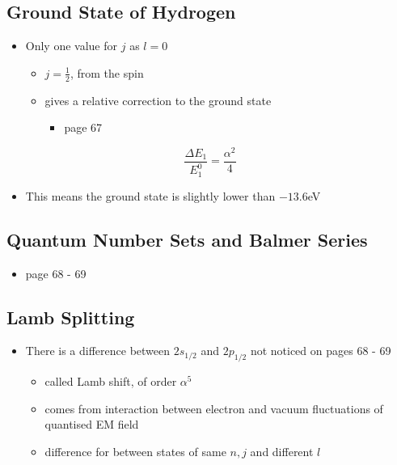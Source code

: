 \documentclass[a4paper,11pt,normalem]{article}
\begin{document}
\subsection{Ground State of Hydrogen}\label{ground-state-of-hydrogen}

\begin{itemize}
\item
  Only one value for \(j\) as \(l = 0\)
  \begin{itemize}
  \item
    \(j = \frac{1}{2}\), from the spin
  \item
    gives a relative correction to the ground state
    \begin{itemize}
    \item
      page 67
    \end{itemize}
  \end{itemize}
\end{itemize}

\[
    \frac{\Delta E_1}{E_1^0} = \frac{\alpha^2}{4}
\]

\begin{itemize}
\item
  This means the ground state is slightly lower than \(-13.6\)eV
\end{itemize}

\subsection{Quantum Number Sets and Balmer Series}\label{quantum-number-sets-and-balmer-series}

\begin{itemize}
\item
  page 68 - 69
\end{itemize}

\subsection{Lamb Splitting}\label{lamb-splitting}

\begin{itemize}
\item
  There is a difference between \(2s_{1/2}\) and \(2p_{1/2}\) not
  noticed on pages 68 - 69
  \begin{itemize}
  \item
    called Lamb shift, of order \(\alpha^5\)
  \item
    comes from interaction between electron and vacuum fluctuations of
    quantised EM field
  \item
    difference for between states of same \(n, j\) and different \(l\)
  \end{itemize}
\end{itemize}
\end{document}
